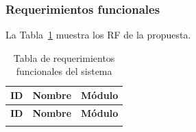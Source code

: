\subsubsection{Requerimientos funcionales}

La Tabla~\ref{tab:requerimientos_funcionales} muestra los RF de la propuesta.

\begin{longtable}{|p{1.1cm}|p{9.2cm}|p{4.1cm}|}
\caption{Tabla de requerimientos funcionales del sistema}
\label{tab:requerimientos_funcionales} \\
\hline
\textbf{ID} & \textbf{Nombre} & \textbf{Módulo} \\
\hline
\endfirsthead
\hline
\textbf{ID} & \textbf{Nombre} & \textbf{Módulo} \\
\hline
\endhead
\hline
\endfoot


\end{longtable}
